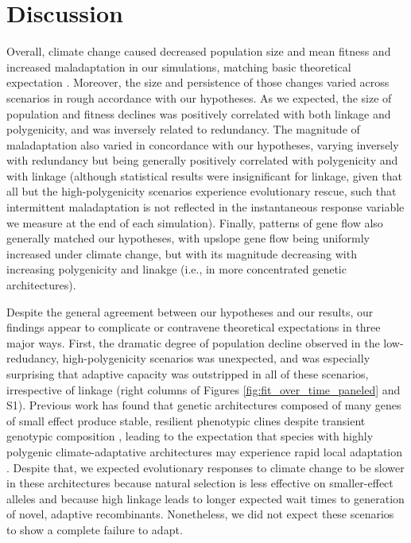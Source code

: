 \documentclass[9pt,twocolumn,twoside,lineno]{pnas-new}
\begin{document}
\section*{Discussion}

Overall, climate change caused decreased
population size and mean fitness and increased
maladaptation in our simulations,
matching basic theoretical expectation \cite{aitken_whitlock}.
Moreover, the size and persistence of those changes varied across scenarios
in rough accordance with our hypotheses.
As we expected, the size of population and fitness declines was 
positively correlated with both linkage and polygenicity, and was
inversely related to redundancy.
The magnitude of maladaptation also varied in concordance
with our hypotheses, varying inversely with redundancy but being 
generally positively correlated with polygenicity and with linkage
(although statistical results were insignificant for linkage,
given that all but the high-polygenicity scenarios
experience evolutionary rescue, such that intermittent maladaptation
is not reflected in the instantaneous response variable we measure at the
end of each simulation).
Finally, patterns of gene flow also generally matched our hypotheses,
with upslope gene flow being uniformly increased under climate change,
but with its magnitude decreasing with increasing polygenicity and linakge
(i.e., in more concentrated genetic architectures).

Despite the general agreement between our hypotheses and our results,
our findings appear to complicate or contravene theoretical expectations in three major ways.
First, the dramatic degree of population decline observed in the low-redudancy, high-polygenicity
scenarios was unexpected,
and was especially surprising that adaptive capacity was outstripped in all of these scenarios, irrespective of 
linkage (right columns of Figures \ref{fig:fit_over_time_paneled} and S1).
Previous work has found that genetic architectures composed
of many genes of small effect produce stable, resilient phenotypic clines despite transient genotypic composition \cite{yeaman_amnat,yeaman_review},
leading to the expectation that species with highly polygenic climate-adaptative architectures 
may experience rapid local adaptation \cite{aitken_yeaman}. 
Despite that, we expected evolutionary responses to climate change
to be slower in these architectures
because natural selection is less effective on smaller-effect alleles
and because high linkage leads to longer expected wait times to generation
of novel, adaptive recombinants.
Nonetheless, we did not expect these scenarios to show a complete failure to adapt.
\end{document}
